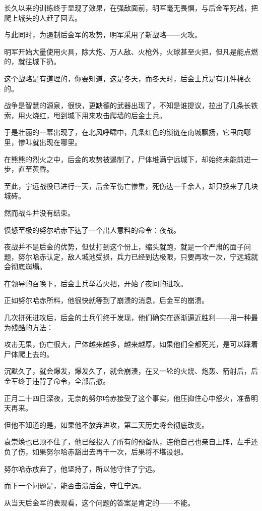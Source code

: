 \begin{multicols}{\theparacolNo}
		长久以来的训练终于显现了效果，在强敌面前，明军毫无畏惧，与后金军死战，把爬上城头的人赶了回去。

		与此同时，为遏制后金军的攻势，明军采用了新战略——火攻。

		明军开始大量使用火具，除大炮、万人敌、火枪外，火球甚至火把，但凡是能点燃的，就往城下扔。

		这个战略是有道理的，你要知道，这是冬天，而冬天时，后金士兵是有几件棉衣的。

		战争是智慧的源泉，很快，更缺德的武器出现了，不知是谁提议，拉出了几条长铁索，用火烧红，甩到城下用来攻击爬墙的后金士兵。

		于是壮丽的一幕出现了，在北风呼啸中，几条红色的锁链在南城飘扬，它甩向哪里，惨叫就出现在哪里。

		在熊熊的烈火之中，后金的攻势被遏制了，尸体堆满宁远城下，却始终未能前进一步，直至黄昏。

		至此，宁远战役已进行一天，后金军伤亡惨重，死伤达一千余人，却只换来了几块城砖。

		然而战斗并没有结束。

		愤怒至极的努尔哈赤下达了一个出人意料的命令：夜战。

		夜战并不是后金的优势，但仗打到这个份上，缩头就跑，就是一个严肃的面子问题，努尔哈赤认定，敌人城池受损，兵力已经到达极限，只要再攻一次，宁远城就会彻底崩塌。

		在领导的召唤下，后金士兵举着火把，开始了夜间的进攻。

		正如努尔哈赤所料，他很快就等到了崩溃的消息，后金军的崩溃。

		几次拼死进攻后，后金的士兵们终于发现，他们确实在逐渐逼近胜利——用一种最为残酷的方法：

		攻击无果，伤亡很大，尸体越来越多，越来越厚，如果他们全都死光，是可以踩着尸体爬上去的。

		沉默久了，就会爆发，爆发久了，就会崩溃，在又一轮的火烧、炮轰、箭射后，后金军终于违背了命令，全部后撤。

		正月二十四日深夜，无奈的努尔哈赤接受了这个事实，他压抑住心中怒火，准备明天再来。

		但他不知道的是，如果他不放弃进攻，第二天历史将会彻底改变。

		袁崇焕也已顶不住了，他已经投入了所有的预备队，连他自己也亲自上阵，左手还负了伤，如果努尔哈赤豁出去再干一次，后果将不堪设想。

		努尔哈赤放弃了，他坚持了，所以他守住了宁远。

		而下一个问题是，能否击溃后金，守住宁远。

		从当天后金军的表现看，这个问题的答案是肯定的——不能。


\end{multicols}
